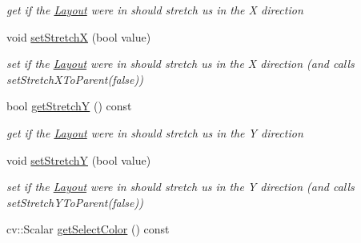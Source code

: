 \begin{DoxyCompactItemize}
\begin{DoxyCompactList}\small\item\em get if the \hyperlink{classcanvascv_1_1Layout}{Layout} we\textquotesingle{}re in should stretch us in the X direction \end{DoxyCompactList}\item 
void \hyperlink{classcanvascv_1_1Widget_a7cdddebd755c499712793f727a057733}{set\+StretchX} (bool value)\hypertarget{classcanvascv_1_1Widget_a7cdddebd755c499712793f727a057733}{}\label{classcanvascv_1_1Widget_a7cdddebd755c499712793f727a057733}

\begin{DoxyCompactList}\small\item\em set if the \hyperlink{classcanvascv_1_1Layout}{Layout} we\textquotesingle{}re in should stretch us in the X direction (and calls set\+Stretch\+X\+To\+Parent(false)) \end{DoxyCompactList}\item 
bool \hyperlink{classcanvascv_1_1Widget_a267ab2d3df58dce8c1e823050d811157}{get\+StretchY} () const \hypertarget{classcanvascv_1_1Widget_a267ab2d3df58dce8c1e823050d811157}{}\label{classcanvascv_1_1Widget_a267ab2d3df58dce8c1e823050d811157}

\begin{DoxyCompactList}\small\item\em get if the \hyperlink{classcanvascv_1_1Layout}{Layout} we\textquotesingle{}re in should stretch us in the Y direction \end{DoxyCompactList}\item 
void \hyperlink{classcanvascv_1_1Widget_a3ef50b76d33c332cea4e632346b6df33}{set\+StretchY} (bool value)\hypertarget{classcanvascv_1_1Widget_a3ef50b76d33c332cea4e632346b6df33}{}\label{classcanvascv_1_1Widget_a3ef50b76d33c332cea4e632346b6df33}

\begin{DoxyCompactList}\small\item\em set if the \hyperlink{classcanvascv_1_1Layout}{Layout} we\textquotesingle{}re in should stretch us in the Y direction (and calls set\+Stretch\+Y\+To\+Parent(false)) \end{DoxyCompactList}\item 
cv\+::\+Scalar \hyperlink{classcanvascv_1_1Widget_a37432df7d7e0029c98154d99d1e621bc}{get\+Select\+Color} () const \hypertarget{classcanvascv_1_1Widget_a37432df7d7e0029c98154d99d1e621bc}{}\label{classcanvascv_1_1Widget_a37432df7d7e0029c98154d99d1e621bc}


\end{DoxyCompactItemize}
